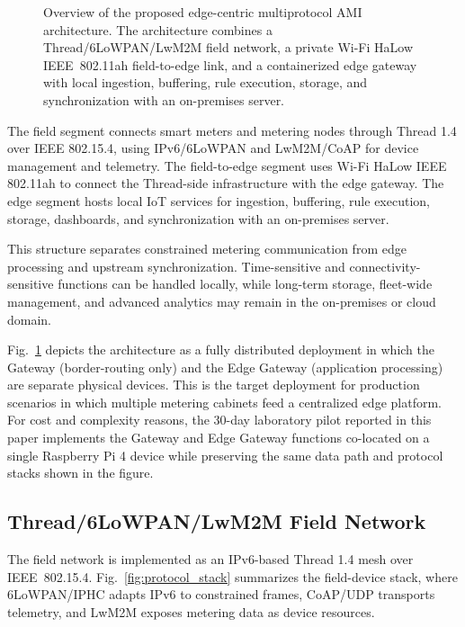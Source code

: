 \documentclass[conference]{IEEEtran}
\begin{document}
\begin{figure}[t]
    \centering
    \resizebox{1\linewidth}{!}{
        
    }
    \caption{Overview of the proposed edge-centric multiprotocol AMI architecture. The architecture combines a Thread/6LoWPAN/LwM2M field network, a private Wi-Fi HaLow IEEE~802.11ah field-to-edge link, and a containerized edge gateway with local ingestion, buffering, rule execution, storage, and synchronization with an on-premises server.}
    \label{fig:architecture_overview}
\end{figure}

The field segment connects smart meters and metering nodes through Thread 1.4 over IEEE 802.15.4, using IPv6/6LoWPAN and LwM2M/CoAP for device management and telemetry. The field-to-edge segment uses Wi-Fi HaLow IEEE 802.11ah to connect the Thread-side infrastructure with the edge gateway. The edge segment hosts local IoT services for ingestion, buffering, rule execution, storage, dashboards, and synchronization with an on-premises server.

This structure separates constrained metering communication from edge processing and upstream synchronization. Time-sensitive and connectivity-sensitive functions can be handled locally, while long-term storage, fleet-wide management, and advanced analytics may remain in the on-premises or cloud domain.

Fig.~\ref{fig:architecture_overview} depicts the architecture as a fully distributed deployment in which the Gateway (border-routing only) and the Edge Gateway (application processing) are separate physical devices. This is the target deployment for production scenarios in which multiple metering cabinets feed a centralized edge platform. For cost and complexity reasons, the 30-day laboratory pilot reported in this paper implements the Gateway and Edge Gateway functions co-located on a single Raspberry Pi 4 device while preserving the same data path and protocol stacks shown in the figure.

\subsection{Thread/6LoWPAN/LwM2M Field Network}
\label{subsec:field_network}

The field network is implemented as an IPv6-based Thread 1.4 mesh over IEEE~802.15.4. Fig.~\ref{fig:protocol_stack} summarizes the field-device stack, where 6LoWPAN/IPHC adapts IPv6 to constrained frames, CoAP/UDP transports telemetry, and LwM2M exposes metering data as device resources.
\end{document}
